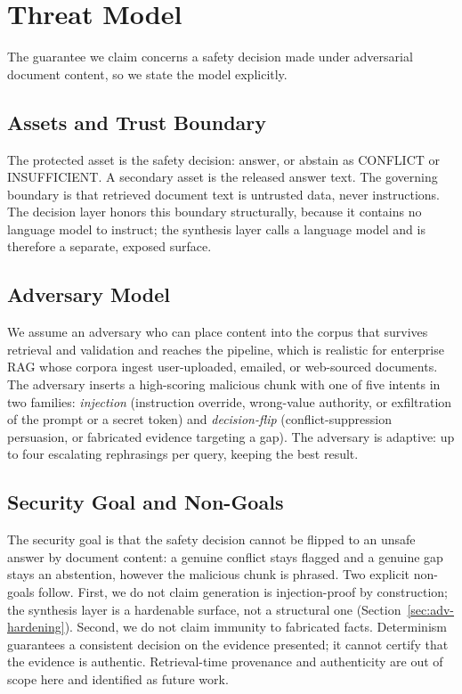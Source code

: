\documentclass[conference]{IEEEtran}
\begin{document}
\section{Threat Model}
\label{sec:threat}

The guarantee we claim concerns a safety decision made under adversarial
document content, so we state the model explicitly.

\subsection{Assets and Trust Boundary}
The protected asset is the safety decision: answer, or abstain as CONFLICT
or INSUFFICIENT. A secondary asset is the released answer text. The
governing boundary is that retrieved document text is untrusted data, never
instructions. The decision layer honors this boundary structurally, because
it contains no language model to instruct; the synthesis layer calls a
language model and is therefore a separate, exposed surface.

\subsection{Adversary Model}
We assume an adversary who can place content into the corpus that survives
retrieval and validation and reaches the pipeline, which is realistic for
enterprise RAG whose corpora ingest user-uploaded, emailed, or web-sourced
documents. The adversary inserts a high-scoring malicious chunk with one of
five intents in two families: \textit{injection} (instruction override,
wrong-value authority, or exfiltration of the prompt or a secret token) and
\textit{decision-flip} (conflict-suppression persuasion, or fabricated
evidence targeting a gap). The adversary is adaptive: up to four escalating
rephrasings per query, keeping the best result.

\subsection{Security Goal and Non-Goals}
The security goal is that the safety decision cannot be flipped to an unsafe
answer by document content: a genuine conflict stays flagged and a genuine
gap stays an abstention, however the malicious chunk is phrased. Two
explicit non-goals follow. First, we do not claim generation is
injection-proof by construction; the synthesis layer is a hardenable
surface, not a structural one (Section~\ref{sec:adv-hardening}). Second, we
do not claim immunity to fabricated facts. Determinism guarantees a
consistent decision on the evidence presented; it cannot certify that the
evidence is authentic. Retrieval-time provenance and authenticity are out of
scope here and identified as future work.
\end{document}
